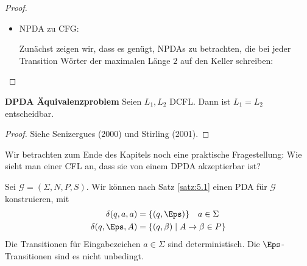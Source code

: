 {\begin{proof}
\begin{itemize}
  \item \ac{NPDA} zu \ac{CFG}:

    Zunächst zeigen wir, dass es genügt, \ac{NPDA}s zu betrachten, die bei jeder Transition Wörter der maximalen Länge $2$ auf den Keller schreiben:



\end{itemize}
  
\end{proof}



\begin{Satz} \textbf{DPDA Äquivalenzproblem}
    Seien $L_1, L_2$ DCFL. Dann ist $L_1 = L_2$ entscheidbar.
\end{Satz}

\begin{proof}
    Siehe Senizergues (2000) und Stirling (2001).
\end{proof}

Wir betrachten zum Ende des Kapitels noch eine praktische Fragestellung: Wie sieht man einer CFL an, dass sie von einem DPDA akzeptierbar ist?

Sei $\mathcal{G} = (\Sigma, N, P, S)$.
Wir können nach Satz \ref{satz:5.1} einen \ac{PDA} für $\mathcal{G}$ konstruieren, mit
\begin{align*}
  \delta(q, a, a) &= \{(q, \Eps)\} \quad a \in \Sigma \\
  \delta(q, \Eps, A) &= \{(q, \beta)  \mid A \to \beta \in P\}
\end{align*}
Die Transitionen für Eingabezeichen $a \in \Sigma$ sind deterministisch.
Die $\Eps$-Transitionen sind es nicht unbedingt.

}
